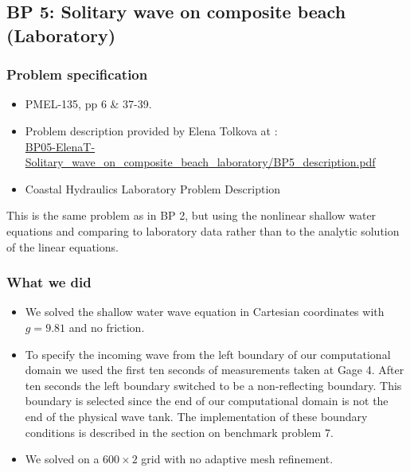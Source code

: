 \newsection

\subsection{BP 5:
 Solitary wave on composite beach (Laboratory) }


\subsubsection{Problem specification}

\begin{itemize}
\item PMEL-135, pp 6 \& 37-39.

\item Problem description provided by Elena Tolkova at
\cite{bp-description}:\\
\href{https://github.com/rjleveque/nthmp-benchmark-problems/blob/master/BP05-ElenaT-Solitary_wave_on_composite_beach_laboratory/BP5_description.pdf}
{BP05-ElenaT-Solitary\_wave\_on\_composite\_beach\_laboratory/BP5\_description.pdf} 

\item Coastal Hydraulics Laboratory Problem Description\cite{CHLBP2}
\end{itemize}

This is the same problem as in BP 2, but using the nonlinear shallow water
equations and comparing to laboratory data rather than to the analytic
solution of the linear equations.

\subsubsection{What we did}
\begin{itemize}
\item We solved the shallow water wave equation in Cartesian coordinates with $g = 9.81$ and no friction.
\item To specify the incoming wave from the left boundary of our computational domain we used the first ten seconds of  measurements taken at Gage 4.  After ten seconds the left boundary switched to be a non-reflecting boundary.  This boundary is selected since the end of our computational domain is not the end of the physical wave tank.  The implementation of these boundary conditions is described in the section on benchmark problem 7. 
\item We solved on a $600 \times 2$ grid with no adaptive mesh refinement. 
\end{itemize}

